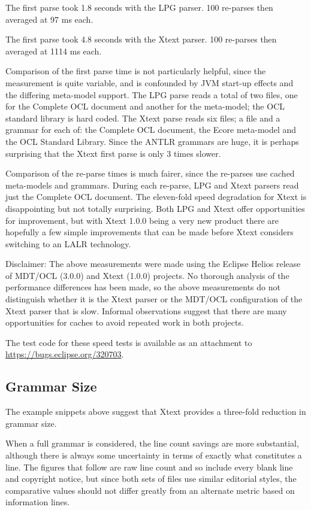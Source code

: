 \documentclass[runningheads,a4paper]{llncs}
\begin{document}
The first parse took 1.8 seconds with the LPG parser. 100 re-parses then averaged at 97 ms each.

The first parse took 4.8 seconds with the Xtext parser. 100 re-parses then averaged at 1114  ms each.

Comparison of the first parse time is not particularly helpful, since the measurement is quite variable, and is confounded by JVM start-up effects and the differing meta-model support. The LPG parse reads a total of two files, one for the Complete OCL document and another for the meta-model; the OCL standard library is hard coded. The Xtext parse reads six files; a file and a grammar for each of: the Complete OCL document, the Ecore meta-model and the OCL Standard Library. Since the ANTLR grammars are huge, it is perhaps surprising that the Xtext first parse is only 3 times slower.

Comparison of the re-parse times is much fairer, since the re-parses use cached meta-models and grammars. During each re-parse, LPG and Xtext parsers read just the Complete OCL document. The eleven-fold speed degradation for Xtext is disappointing but not totally surprising. Both LPG and Xtext offer opportunities for improvement, but with Xtext 1.0.0 being a very new product there are hopefully a few simple improvements that can be made before Xtext considers switching to an LALR technology.

Disclaimer: The above measurements were made using the Eclipse Helios release of MDT/OCL (3.0.0) and Xtext (1.0.0) projects. No thorough analysis of the performance differences has been made, so the above measurements do not distinguish whether it is the Xtext parser or the MDT/OCL configuration of the Xtext parser that is slow. Informal observations suggest that there are many opportunities for caches to avoid repeated work in both projects.

The test code for these speed tests is available as an attachment to \url{https://bugs.eclipse.org/320703}.

\subsection{Grammar Size}

The example snippets above suggest that Xtext provides a three-fold reduction in grammar size.

When a full grammar is considered, the line count savings are more substantial, although there is always some uncertainty in terms of exactly what constitutes a line. The figures that follow are raw line count and so include every blank line and copyright notice, but since both sets of files use similar editorial styles, the comparative values should not differ greatly from an alternate metric based on information lines.
\end{document}
